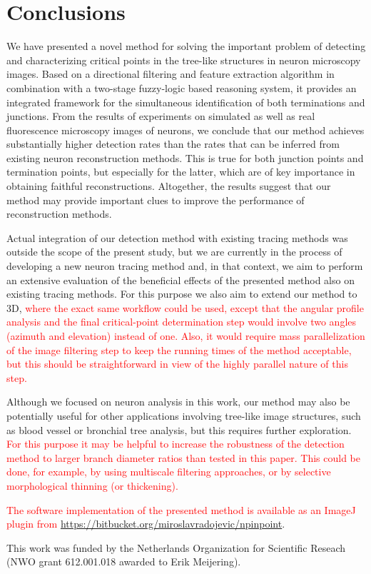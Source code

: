 \documentclass[twocolumn,natbib]{svjour3}
\newcommand{\marked}[1]{\textcolor{red}{#1}}
\begin{document}
\section{Conclusions} 
\label{sec:conclusions}
We have presented a novel method for solving the important problem of detecting and characterizing critical points in the tree-like structures in neuron microscopy images. Based on a directional filtering and feature extraction algorithm in combination with a two-stage fuzzy-logic based reasoning system, it provides an integrated framework for the simultaneous identification of both terminations and junctions. From the results of experiments on simulated as well as real fluorescence microscopy images of neurons, we conclude that our method achieves substantially higher detection rates than the rates that can be inferred from existing neuron reconstruction methods. This is true for both junction points and termination points, but especially for the latter, which are of key importance in obtaining faithful reconstructions. Altogether, the results suggest that our method may provide important clues to improve the performance of reconstruction methods.

Actual integration of our detection method with existing tracing methods was outside the scope of the present study, but we are currently in the process of developing a new neuron tracing method and, in that context, we aim to perform an extensive evaluation of the beneficial effects of the presented method also on existing tracing methods. For this purpose we also aim to extend our method to 3D, \marked{where the exact same workflow could be used, except that the angular profile analysis and the final critical-point determination step would involve two angles (azimuth and elevation) instead of one. Also, it would require mass parallelization of the image filtering step to keep the running times of the method acceptable, but this should be straightforward in view of the highly parallel nature of this step.}

Although we focused on neuron analysis in this work, our method may also be potentially useful for other applications involving tree-like image structures, such as blood vessel or bronchial tree analysis, but this requires further exploration. \marked{For this purpose it may be helpful to increase the robustness of the detection method to larger branch diameter ratios than tested in this paper. This could be done, for example, by using multiscale filtering approaches, or by selective morphological thinning (or thickening).}

\marked{The software implementation of the presented method is available as an ImageJ plugin from \url{https://bitbucket.org/miroslavradojevic/npinpoint}}.

\begin{acknowledgements}
This work was funded by the Netherlands Organization for Scientific Reseach (NWO grant 612.001.018 awarded to Erik Meijering).
\end{acknowledgements}

  
\end{document}
